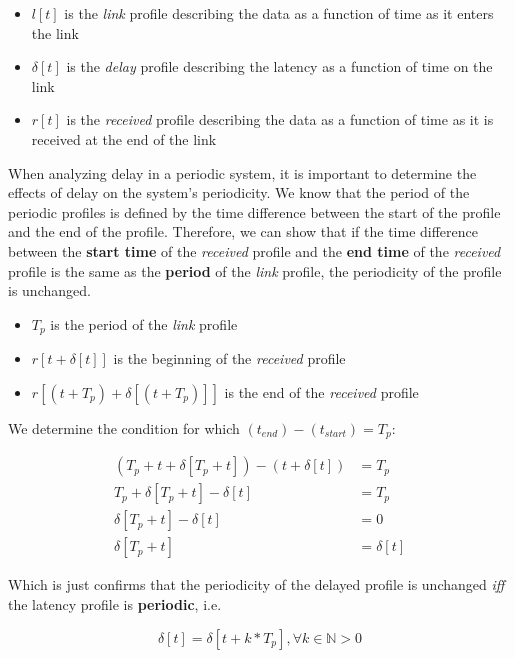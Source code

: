 \begin{itemize}
\item $l[t]$ is the \emph{link} profile describing the data as a
  function of time as it enters the link
\item $\delta[t]$ is the \emph{delay} profile describing the latency
  as a function of time on the link
\item $r[t]$ is the \emph{received} profile describing the data as a
  function of time as it is received at the end of the link
\end{itemize}
  
When analyzing delay in a periodic system, it is important to
determine the effects of delay on the system's periodicity.  We know
that the period of the periodic profiles is defined by the time
difference between the start of the profile and the end of the
profile.  Therefore, we can show that if the time difference between
the \textbf{start time} of the \emph{received} profile and the
\textbf{end time} of the \emph{received} profile is the same as the
\textbf{period} of the \emph{link} profile, the periodicity of the
profile is unchanged.

\begin{itemize}
\item $T_p$ is the period of the \emph{link} profile
\item $r[t + \delta[t]]$ is the beginning of the \emph{received}
  profile
\item $r[(t + T_p) + \delta[(t + T_p)]]$ is the end of the
  \emph{received} profile
\end{itemize}

We determine the condition for which $(t_{end}) - (t_{start}) =
T_p$:

\begin{equation}
  \begin{split}
    (T_p + t + \delta[T_p + t]) - (t + \delta[t]) &= T_p \\
    T_p + \delta[T_p + t] - \delta[t] &= T_p \\
    \delta[T_p + t] - \delta[t] &= 0\\
    \delta[T_p + t] &= \delta[t]
  \end{split}
\end{equation}

Which is just confirms that the periodicity of the delayed profile is
unchanged \emph{iff} the latency profile is \textbf{periodic}, i.e.

\begin{equation}
\delta[t] = \delta[t + k*T_p], \forall k\in\mathbb{N} > 0
\end{equation}

